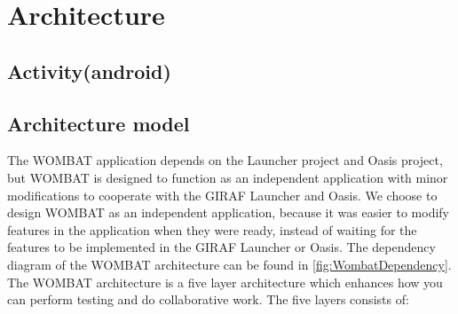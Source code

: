 \section{Architecture}
\label{sec:Architecture}
\subsection{Activity(android)}

\subsection{Architecture model}
The WOMBAT application depends on the Launcher project and Oasis project, but WOMBAT is designed to function as an independent application with minor modifications to cooperate with the GIRAF Launcher and Oasis.
We choose to design WOMBAT as an independent application, because it was easier to modify features in the application when they were ready, instead of waiting for the features to be implemented in the GIRAF Launcher or Oasis. 
The dependency diagram of the WOMBAT architecture can be found in \autoref{fig:WombatDependency}.
The WOMBAT architecture is a five layer architecture which enhances how you can perform testing and do collaborative work. 
The five layers consists of: 

